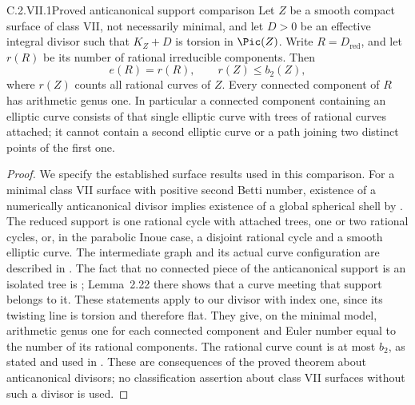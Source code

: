 \begin{idstatement}{C.2.VII.1}{Proved anticanonical support comparison}
\label{st:C.2.VII.1}
Let $Z$ be a smooth compact surface of class VII, not
necessarily minimal, and let $D>0$ be an effective integral
divisor such that $K_Z+D$ is torsion in $\Pic(Z)$.
Write $R=D_{\mathrm{red}}$, and let $r(R)$ be its number
of rational irreducible components. Then
\[
 e(R)=r(R),\qquad r(Z)\le b_2(Z),
\tag{C.VII.1}
\]
where $r(Z)$ counts all rational curves of $Z$.
Every connected component of $R$ has arithmetic genus one.
In particular a connected component containing an elliptic
curve consists of that single elliptic curve with trees of
rational curves attached; it cannot contain a second
elliptic curve or a path joining two distinct points of the
first one.
\end{idstatement}
\begin{proof}
We specify the established surface results used in this
comparison. For a minimal class VII surface with positive
second Betti number, existence of a numerically
anticanonical divisor implies existence of a global
spherical shell by
\cite[Theorem~0.2, Proposition~2.29 and Theorem~2.38]{Dloussky2006}.
The reduced support is one rational cycle with attached
trees, one or two rational cycles, or, in the parabolic
Inoue case, a disjoint rational cycle and a smooth elliptic
curve. The intermediate graph and its actual curve
configuration are described in
\cite[\S1, pp.~284--285, and \S3, p.~296]{DOT2003}.
The fact that no connected piece of the anticanonical
support is an isolated tree is
\cite[Corollary~2.25 and Proposition~2.27]{Dloussky2006};
Lemma~2.22 there shows that a curve meeting that support
belongs to it. These statements apply to our divisor with
index one, since its twisting line is torsion and therefore
flat. They give, on the minimal model, arithmetic genus
one for each connected component and Euler number equal
to the number of its rational components. The rational
curve count is at most $b_2$, as stated and used in
\cite[Introduction, p.~283]{DOT2003}.
These are consequences of the proved theorem about
anticanonical divisors; no classification assertion about
class VII surfaces without such a divisor is used.


\end{proof}
